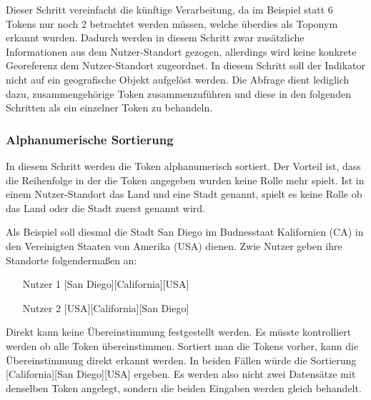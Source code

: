 		  		Dieser Schritt vereinfacht die künftige Verarbeitung, da im Beispiel statt 6 Tokens nur noch 2 betrachtet werden müssen, welche überdies als Toponym erkannt wurden.
		  		Dadurch werden in diesem Schritt zwar zusätzliche Informationen aus dem Nutzer-Standort gezogen, allerdings wird keine konkrete Georeferenz dem Nutzer-Standort zugeordnet.
		  		In diesem Schritt soll der Indikator nicht auf ein geografische Objekt aufgelöst werden. 
		  		Die Abfrage dient lediglich dazu, zusammengehörige Token zusammenzuführen und diese in den folgenden Schritten als ein einzelner Token zu behandeln. 




		  	\subsubsection{Alphanumerische Sortierung}

		  		In diesem Schritt werden die Token alphanumerisch sortiert. 
		  		Der Vorteil ist, dass die Reihenfolge in der die Token angegeben wurden keine Rolle mehr spielt. 
		  		Ist in einem Nutzer-Standort das Land und eine Stadt genannt, spielt es keine Rolle ob das Land oder die Stadt zuerst genannt wird. 

		  		Als Beispiel soll diesmal die Stadt San Diego im Budnesstaat Kalifornien (CA) in den Vereinigten Staaten von Amerika (USA) dienen. 
		  		Zwie Nutzer geben ihre Standorte folgendermaßen an:

		  		\begin{enumerate}
		  			\item[Nutzer 1]  	[San Diego][California][USA]
		  			\item[Nutzer 2] 	[USA][California][San Diego] 
		  		\end{enumerate}

		  		Direkt kann keine Übereinstimmung festgestellt werden. 
		  		Es müsste kontrolliert werden ob alle Token übereinstimmen.
		  		Sortiert man die Tokens vorher, kann die Übereinstimmung direkt erkannt werden.
		  		In beiden Fällen würde die Sortierung [California][San Diego][USA] ergeben.
		  		Es werden also nicht zwei Datensätze mit denselben Token angelegt, sondern die beiden Eingaben werden gleich behandelt.





